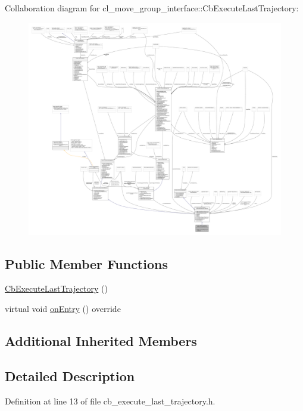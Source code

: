 Collaboration diagram for cl\+\_\+move\+\_\+group\+\_\+interface\+:\+:Cb\+Execute\+Last\+Trajectory\+:
\nopagebreak
\begin{figure}[H]
\begin{center}
\leavevmode
\includegraphics[width=350pt]{classcl__move__group__interface_1_1CbExecuteLastTrajectory__coll__graph}
\end{center}
\end{figure}
\subsection*{Public Member Functions}
\begin{DoxyCompactItemize}
\item 
\hyperlink{classcl__move__group__interface_1_1CbExecuteLastTrajectory_a7198565fc92e12873da31192cf116617}{Cb\+Execute\+Last\+Trajectory} ()
\item 
virtual void \hyperlink{classcl__move__group__interface_1_1CbExecuteLastTrajectory_ae38979b0c2b3f50225ff32e66cd5f0c7}{on\+Entry} () override
\end{DoxyCompactItemize}
\subsection*{Additional Inherited Members}


\subsection{Detailed Description}


Definition at line 13 of file cb\+\_\+execute\+\_\+last\+\_\+trajectory.\+h.



